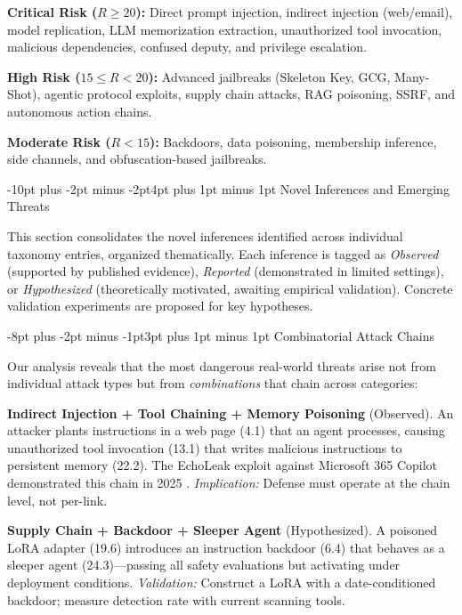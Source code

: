 \documentclass[conference]{IEEEtran}
\makeatletter
\renewcommand{\section}{\@startsection{section}{1}{\z@}%
  {-10pt plus -2pt minus -2pt}{4pt plus 1pt minus 1pt}%
  {\normalfont\large\bfseries\sffamily\color{accentdark}}}
\renewcommand{\subsection}{\@startsection{subsection}{2}{\z@}%
  {-8pt plus -2pt minus -1pt}{3pt plus 1pt minus 1pt}%
  {\normalfont\normalsize\bfseries\sffamily\color{accentblue}}}
\makeatother
\begin{document}
\begin{tcolorbox}[keyfinding, title={Risk Tiers Summary}]
\textbf{\color{critred}Critical Risk ($R \geq 20$):} Direct prompt injection, indirect injection (web/email), model replication, LLM memorization extraction, unauthorized tool invocation, malicious dependencies, confused deputy, and privilege escalation.

\textbf{\color{orange!80!black}High Risk ($15 \leq R < 20$):} Advanced jailbreaks (Skeleton Key, GCG, Many-Shot), agentic protocol exploits, supply chain attacks, RAG poisoning, SSRF, and autonomous action chains.

\textbf{\color{accentblue}Moderate Risk ($R < 15$):} Backdoors, data poisoning, membership inference, side channels, and obfuscation-based jailbreaks.
\end{tcolorbox}


\section{Novel Inferences and Emerging Threats}\label{sec:novel}


This section consolidates the novel inferences identified across individual taxonomy entries, organized thematically. Each inference is tagged as \textit{Observed} (supported by published evidence), \textit{Reported} (demonstrated in limited settings), or \textit{Hypothesized} (theoretically motivated, awaiting empirical validation). Concrete validation experiments are proposed for key hypotheses.

\subsection{Combinatorial Attack Chains}

Our analysis reveals that the most dangerous real-world threats arise not from individual attack types but from \emph{combinations} that chain across categories:

\textbf{Indirect Injection + Tool Chaining + Memory Poisoning} (Observed). An attacker plants instructions in a web page (4.1) that an agent processes, causing unauthorized tool invocation (13.1) that writes malicious instructions to persistent memory (22.2). The EchoLeak exploit against Microsoft 365 Copilot demonstrated this chain in 2025 \cite{echoleak2025}. \textit{Implication:} Defense must operate at the chain level, not per-link.

\textbf{Supply Chain + Backdoor + Sleeper Agent} (Hypothesized). A poisoned LoRA adapter (19.6) introduces an instruction backdoor (6.4) that behaves as a sleeper agent (24.3)---passing all safety evaluations but activating under deployment conditions. \textit{Validation:} Construct a LoRA with a date-conditioned backdoor; measure detection rate with current scanning tools.
\end{document}
